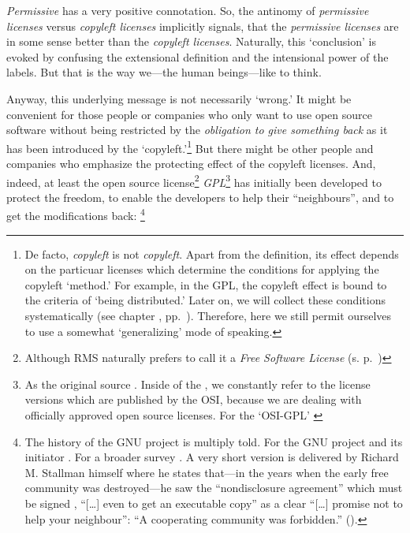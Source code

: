 \emph{Permissive} has a very positive connotation. So, the antinomy of
\emph{permissive licenses} versus \emph{copyleft licenses} implicitly signals,
that the \emph{permissive licenses} are in some sense better than the
\emph{copyleft licenses}. Naturally, this `conclusion' is evoked by
confusing the extensional definition and the intensional power of the labels.
But that is the way we---the human beings---like to think. 

Anyway, this underlying message is not necessarily `wrong.' It might be
convenient for those people or companies who only want to use open source
software without being restricted by the \emph{obligation to give something
back} as it has been introduced by the `copyleft.'\footnote{De facto,
\emph{copyleft} is not \emph{copyleft}. Apart from the definition, its effect
depends on the par\-ti\-cu\-ar licenses which determine the conditions for
applying the copyleft `method.' For example, in the GPL, the copyleft effect is
bound to the criteria of `being distributed.' Later on, we will collect these
conditions systematically (see chapter \emph{}, pp.\
\pageref{sec:OSUCdeduction}). Therefore, here we still permit ourselves to use a
somewhat `generalizing' mode of speaking.} But there might be other people and
companies who emphasize the protecting effect of the copyleft licenses. And,
indeed, at least the open source license\footnote{Although RMS naturally prefers
to call it a \emph{Free Software License} (s. p.\ \pageref{RmsFsPriority})
} \emph{GPL}\footnote{As the original source \cite[cf.][\nopage
wp]{Gpl20FsfLicense1991a}. Inside of the \oslic, we constantly refer to the
license versions which are published by the OSI, because we are dealing with
officially approved open source licenses. For the `OSI-GPL' \cite[cf.][\nopage
wp]{Gpl20OsiLicense1991a}} has initially been developed to protect the freedom,
to enable the developers to help their \enquote{neighbours}, and to get the
modifications back:%
  \footnote{The history of the GNU project is multiply told. For
  the GNU project and its initiator \cite[cf.\ pars pro toto][\nopage
  passim]{Williams2002a}. For a broader survey \cite[cf.\ pars pro toto][\nopage
  passim]{Moody2001a}. A very short version is delivered by Richard M. Stallman
  himself where he states that---in the years when the early free community was
  destroyed---he saw the \enquote{nondisclosure agreement} which must be signed ,
  \enquote{[\ldots] even to get an executable copy} as a clear \enquote{[\ldots]
  promise not to help your neighbour}: \enquote{A cooperating community was
  forbidden.} (\cite[cf.][16]{Stallman1999a}).}
